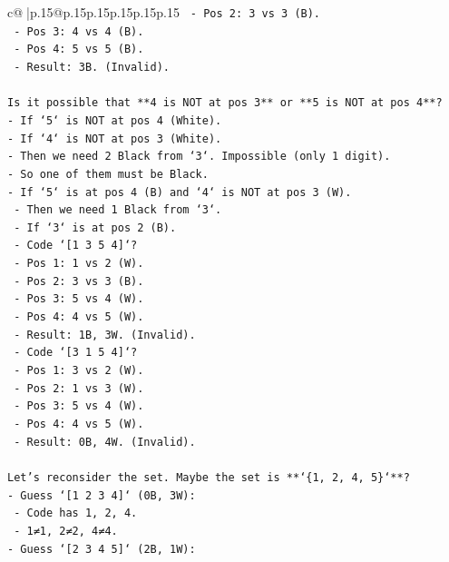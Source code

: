 \documentclass{article}
\begin{document}
{\begin{supertabular}{c@{$\;$}|p{.15\linewidth}@{}p{.15\linewidth}p{.15\linewidth}p{.15\linewidth}p{.15\linewidth}p{.15\linewidth}}
{{{\texttt{    {-} Pos 2: 3 vs 3 (B).} \\
\texttt{    {-} Pos 3: 4 vs 4 (B).} \\
\texttt{    {-} Pos 4: 5 vs 5 (B).} \\
\texttt{    {-} Result: 3B. (Invalid).} \\
\\ 
\texttt{Is it possible that **4 is NOT at pos 3** or **5 is NOT at pos 4**?} \\
\texttt{{-} If `5` is NOT at pos 4 (White).} \\
\texttt{{-} If `4` is NOT at pos 3 (White).} \\
\texttt{{-} Then we need 2 Black from `3`. Impossible (only 1 digit).} \\
\texttt{{-} So one of them must be Black.} \\
\texttt{{-} If `5` is at pos 4 (B) and `4` is NOT at pos 3 (W).} \\
\texttt{    {-} Then we need 1 Black from `3`.} \\
\texttt{    {-} If `3` is at pos 2 (B).} \\
\texttt{    {-} Code `{[}1 3 5 4{]}`?} \\
\texttt{        {-} Pos 1: 1 vs 2 (W).} \\
\texttt{        {-} Pos 2: 3 vs 3 (B).} \\
\texttt{        {-} Pos 3: 5 vs 4 (W).} \\
\texttt{        {-} Pos 4: 4 vs 5 (W).} \\
\texttt{        {-} Result: 1B, 3W. (Invalid).} \\
\texttt{    {-} Code `{[}3 1 5 4{]}`?} \\
\texttt{        {-} Pos 1: 3 vs 2 (W).} \\
\texttt{        {-} Pos 2: 1 vs 3 (W).} \\
\texttt{        {-} Pos 3: 5 vs 4 (W).} \\
\texttt{        {-} Pos 4: 4 vs 5 (W).} \\
\texttt{        {-} Result: 0B, 4W. (Invalid).} \\
\\ 
\texttt{Let's reconsider the set. Maybe the set is **`\{1, 2, 4, 5\}`**?} \\
\texttt{{-} Guess `{[}1 2 3 4{]}` (0B, 3W):} \\
\texttt{    {-} Code has 1, 2, 4.} \\
\texttt{    {-} 1≠1, 2≠2, 4≠4.} \\
\texttt{{-} Guess `{[}2 3 4 5{]}` (2B, 1W):} \\
}}}
\end{supertabular}}
\end{document}
